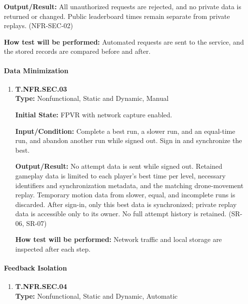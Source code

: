 \documentclass[12pt, titlepage]{article}
\begin{document}
{\begin{enumerate}
\textbf{Output/Result:} All unauthorized requests are rejected, and no private data
is returned or changed. Public leaderboard times remain separate from private replays.
(\mbox{NFR-SEC-02})

\textbf{How test will be performed:} Automated requests are sent to the service, and the
stored records are compared before and after.

\end{enumerate}

\paragraph{Data Minimization}

\begin{enumerate}

\item{\hypertarget{test-nfr-sec-03}{}\textbf{T.NFR.SEC.03}\\}
\textbf{Type:} Nonfunctional, Static and Dynamic, Manual

\textbf{Initial State:} FPVR with network capture enabled.

\textbf{Input/Condition:} Complete a best run, a slower run, and an equal-time run,
and abandon another run while signed out. Sign in and synchronize the best.

\textbf{Output/Result:} No attempt data is sent while signed out. Retained gameplay
data is limited to each player's best time per level, necessary identifiers and
synchronization metadata, and the matching drone-movement replay. Temporary motion
data from slower, equal, and incomplete runs is discarded. After sign-in, only this
best data is synchronized; private replay data is accessible only to its owner.
No full attempt history is retained. (\mbox{SR-06}, \mbox{SR-07})

\textbf{How test will be performed:} Network traffic and local storage are inspected
after each step.

\end{enumerate}

\paragraph{Feedback Isolation}

\begin{enumerate}

\item{\hypertarget{test-nfr-sec-04}{}\textbf{T.NFR.SEC.04}\\}
\textbf{Type:} Nonfunctional, Static and Dynamic, Automatic


\end{enumerate}}
\end{document}

